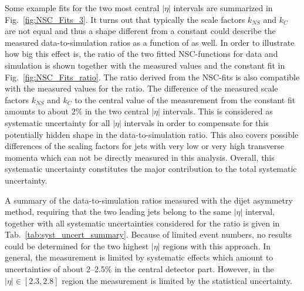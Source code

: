 \begin{description}
Some example fits for the two most central $|\eta|$ intervals are summarized in Fig.~\ref{fig:NSC_Fits_3}. It turns out that typically the scale factors $k_{NS}$ and $k_{C}$ are not equal and thus a shape different from a constant could describe the measured data-to-simulation ratios as a function of \ptave as well. In order to illustrate how big this effect is, the ratio of the two fitted NSC-functions for data and simulation is shown together with the measured values and the constant fit in Fig.~\ref{fig:NSC_Fits_ratio}. The ratio derived from the NSC-fits is also compatible with the measured values for the ratio. The difference of the measured scale factors $k_{NS}$ and $k_{C}$ to the central value of the measurement from the constant fit amounts to about $2\%$ in the two central $|\eta|$ intervals. This is considered as systematic uncertainty for all $|\eta|$ intervals in order to compensate for this potentially hidden shape in the data-to-simulation ratio. This also covers possible differences of the scaling factors for jets with very low or very high transverse momenta which can not be directly measured in this analysis. Overall, this systematic uncertainty constitutes the major contribution to the total systematic uncertainty.
\end{description}
A summary of the data-to-simulation ratios measured with the dijet asymmetry method, requiring that the two leading jets belong to the same $|\eta|$ interval, together with all systematic uncertainties considered for the ratio is given in Tab.~\ref{tab:syst_uncert_summary}. Because of limited event numbers, no results could be determined for the two highest $|\eta|$ regions with this approach. In general, the measurement is limited by systematic effects which amount to uncertainties of about 2--2.5\% in the central detector part. However, in the $|\eta| \in [2.3, 2.8]$ region the measurement is limited by the statistical uncertainty.   

